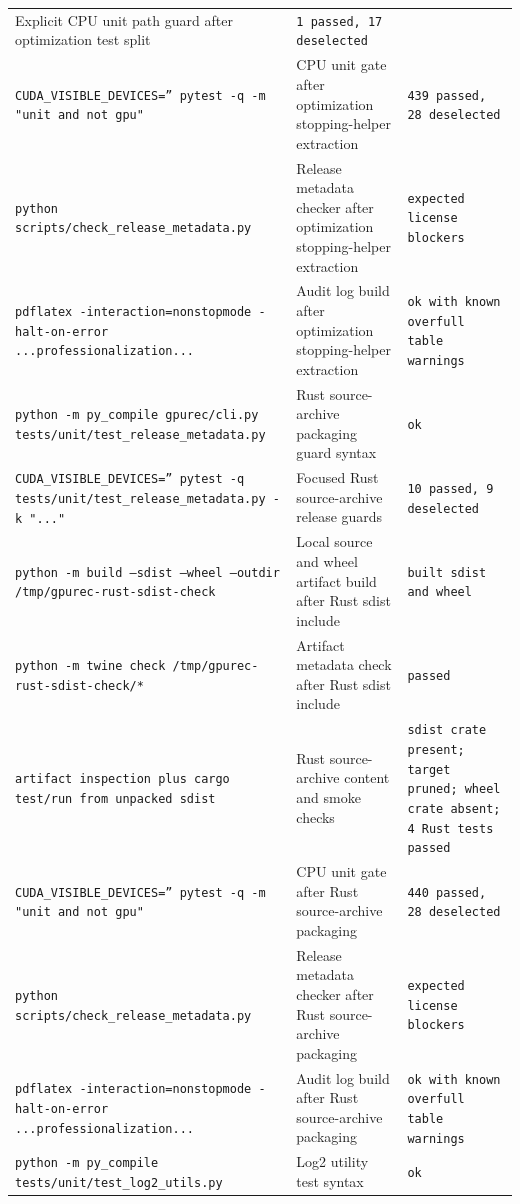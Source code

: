 \documentclass[11pt]{article}
\begin{document}
\begin{center}
\begin{tabular}{lll}
Explicit CPU unit path guard after optimization test split &
\texttt{1 passed, 17 deselected} \\
\texttt{CUDA\_VISIBLE\_DEVICES='' pytest -q -m "unit and not gpu"} &
CPU unit gate after optimization stopping-helper extraction &
\texttt{439 passed, 28 deselected} \\
\texttt{python scripts/check\_release\_metadata.py} &
Release metadata checker after optimization stopping-helper extraction &
\texttt{expected license blockers} \\
\texttt{pdflatex -interaction=nonstopmode -halt-on-error ...professionalization...} &
Audit log build after optimization stopping-helper extraction &
\texttt{ok with known overfull table warnings} \\
\texttt{python -m py\_compile gpurec/cli.py tests/unit/test\_release\_metadata.py} &
Rust source-archive packaging guard syntax &
\texttt{ok} \\
\texttt{CUDA\_VISIBLE\_DEVICES='' pytest -q tests/unit/test\_release\_metadata.py -k "..."} &
Focused Rust source-archive release guards &
\texttt{10 passed, 9 deselected} \\
\texttt{python -m build --sdist --wheel --outdir /tmp/gpurec-rust-sdist-check} &
Local source and wheel artifact build after Rust sdist include &
\texttt{built sdist and wheel} \\
\texttt{python -m twine check /tmp/gpurec-rust-sdist-check/*} &
Artifact metadata check after Rust sdist include &
\texttt{passed} \\
\texttt{artifact inspection plus cargo test/run from unpacked sdist} &
Rust source-archive content and smoke checks &
\texttt{sdist crate present; target pruned; wheel crate absent; 4 Rust tests passed} \\
\texttt{CUDA\_VISIBLE\_DEVICES='' pytest -q -m "unit and not gpu"} &
CPU unit gate after Rust source-archive packaging &
\texttt{440 passed, 28 deselected} \\
\texttt{python scripts/check\_release\_metadata.py} &
Release metadata checker after Rust source-archive packaging &
\texttt{expected license blockers} \\
\texttt{pdflatex -interaction=nonstopmode -halt-on-error ...professionalization...} &
Audit log build after Rust source-archive packaging &
\texttt{ok with known overfull table warnings} \\
\texttt{python -m py\_compile tests/unit/test\_log2\_utils.py} &
Log2 utility test syntax &
\texttt{ok} \\

\end{tabular}
\end{center}
\end{document}
